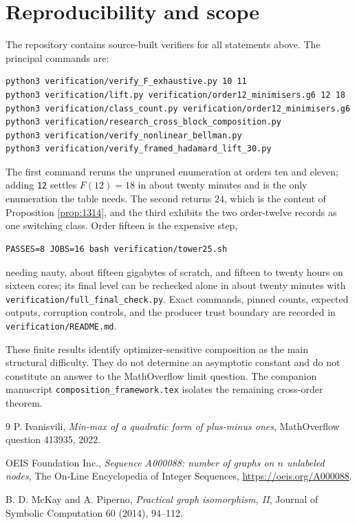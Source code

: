 \documentclass[11pt]{article}
\theoremstyle{remark}
\begin{document}
\section{Reproducibility and scope}

The repository contains source-built verifiers for all statements above.
The principal commands are:
\begin{verbatim}
python3 verification/verify_F_exhaustive.py 10 11
python3 verification/lift.py verification/order12_minimisers.g6 12 18
python3 verification/class_count.py verification/order12_minimisers.g6
python3 verification/research_cross_block_composition.py
python3 verification/verify_nonlinear_bellman.py
python3 verification/verify_framed_hadamard_lift_30.py
\end{verbatim}
The first command reruns the unpruned enumeration at orders ten and eleven;
adding \texttt{12} settles $F(12)=18$ in about twenty minutes and is the only
enumeration the table needs.  The second returns $24$, which is the content of
Proposition \ref{prop:1314}, and the third exhibits the two order-twelve
records as one switching class.  Order fifteen is the expensive step,
\begin{verbatim}
PASSES=8 JOBS=16 bash verification/tower25.sh
\end{verbatim}
needing nauty, about fifteen gigabytes of scratch, and fifteen to twenty hours
on sixteen cores; its final level can be rechecked alone in about twenty
minutes with \texttt{verification/full\_final\_check.py}.  Exact commands,
pinned counts, expected outputs, corruption controls, and the producer trust
boundary are recorded in \texttt{verification/README.md}.

These finite results identify optimizer-sensitive composition as the main
structural difficulty.  They do not determine an asymptotic constant and do
not constitute an answer to the MathOverflow limit question.  The companion
manuscript \texttt{composition\_framework.tex} isolates the remaining
cross-order theorem.

\begin{thebibliography}{9}
P. Ivanisvili,
\emph{Min-max of a quadratic form of plus-minus ones},
MathOverflow question 413935, 2022.

OEIS Foundation Inc.,
\emph{Sequence A000088: number of graphs on $n$ unlabeled nodes},
The On-Line Encyclopedia of Integer Sequences,
\url{https://oeis.org/A000088}.

B. D. McKay and A. Piperno,
\emph{Practical graph isomorphism, II},
Journal of Symbolic Computation 60 (2014), 94--112.
\end{thebibliography}
\end{document}
